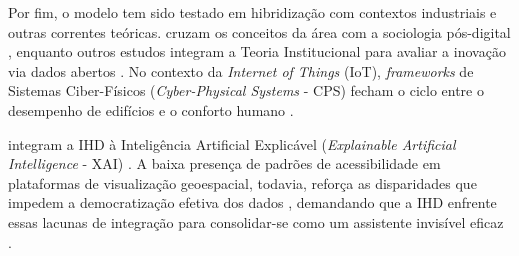 \documentclass[
	12pt,				%
	oneside,			%
	a4paper,			%
	english,			%
	brazil				%
	]{abntex2ppgsi}
\begin{document}
    Por fim, o modelo tem sido testado em hibridização com contextos industriais e outras correntes teóricas.  cruzam os conceitos da área com a sociologia pós-digital \cite{Jandric2023, Zou2020769}, enquanto outros estudos integram a Teoria Institucional para avaliar a inovação via dados abertos \cite{mu2024institutional}. No contexto da \textit{Internet of Things} (IoT), \textit{frameworks} de Sistemas Ciber-Físicos (\textit{Cyber-Physical Systems} - CPS) fecham o ciclo entre o desempenho de edifícios e o conforto humano \cite{bavaresco2019technological}. 

     integram a IHD à Inteligência Artificial Explicável (\textit{Explainable Artificial Intelligence} - XAI) \cite{Yuan20243615, Turkay2021}. A baixa presença de padrões de acessibilidade em plataformas de visualização geoespacial, todavia, reforça as disparidades que impedem a democratização efetiva dos dados \cite{Capeleti2024Human}, demandando que a IHD enfrente essas lacunas de integração para consolidar-se como um assistente invisível eficaz \cite{Capeleti2024Human, Strey2019Human, Belizario2023Interacao}.
\end{document}
